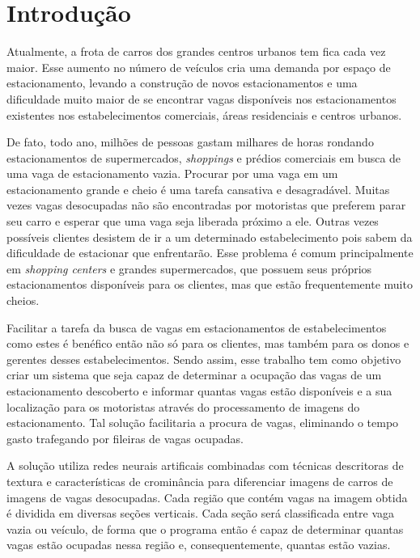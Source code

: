 \chapter{Introdução}\label{cap:intro}

			Atualmente, a frota de carros dos grandes centros urbanos tem fica cada vez maior. Esse aumento no número de veículos cria uma demanda por espaço de estacionamento, levando a construção de novos estacionamentos e uma dificuldade muito maior de se encontrar vagas disponíveis nos estacionamentos existentes nos estabelecimentos comerciais, áreas residenciais e centros urbanos.
			
			De fato, todo ano, milhões de pessoas gastam milhares de horas rondando estacionamentos de supermercados, \textit{shoppings} e prédios comerciais em busca de uma vaga de estacionamento vazia. Procurar por uma vaga em um estacionamento grande e cheio é uma tarefa cansativa e desagradável. Muitas vezes vagas desocupadas não são encontradas por motoristas que preferem parar seu carro e esperar que uma vaga seja liberada próximo a ele. Outras vezes possíveis clientes desistem de ir a um determinado estabelecimento pois sabem da dificuldade de estacionar que enfrentarão. Esse problema é comum principalmente em \textit{shopping centers} e grandes supermercados, que possuem seus próprios estacionamentos disponíveis para os clientes, mas que estão frequentemente muito cheios.
			
			Facilitar a tarefa da busca de vagas em estacionamentos de estabelecimentos como estes é benéfico então não só para os clientes, mas também para os donos e gerentes desses estabelecimentos. Sendo assim, esse trabalho tem como objetivo criar um sistema que seja capaz de determinar a ocupação das vagas de um estacionamento descoberto e informar quantas vagas estão disponíveis e a sua localização para os motoristas através do processamento de imagens do estacionamento. Tal solução facilitaria a procura de vagas, eliminando o tempo gasto trafegando por fileiras de vagas ocupadas.
			
			A solução utiliza redes neurais artificais combinadas com técnicas descritoras de textura e características de crominância para diferenciar imagens de carros de imagens de vagas desocupadas. Cada região que contém vagas na imagem obtida é dividida em diversas seções verticais. Cada seção será classificada entre vaga vazia ou veículo, de forma que o programa então é capaz de determinar quantas vagas estão ocupadas nessa região e, consequentemente, quantas estão vazias.
			
